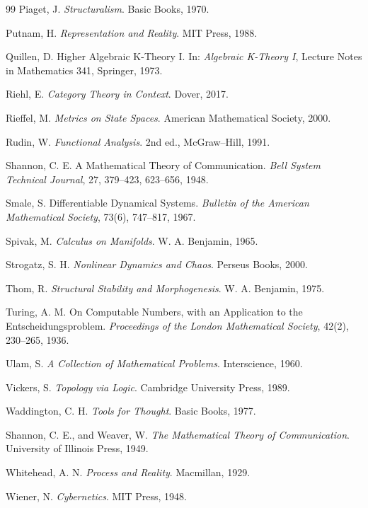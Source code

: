 \documentclass[12pt,oneside]{article}
\theoremstyle{definition}
\begin{document}
\begin{thebibliography}{99}
Piaget, J.
\textit{Structuralism}.
Basic Books, 1970.

Putnam, H.
\textit{Representation and Reality}.
MIT Press, 1988.

Quillen, D.
Higher Algebraic K-Theory I.
In:
\textit{Algebraic K-Theory I},
Lecture Notes in Mathematics 341,
Springer, 1973.

Riehl, E.
\textit{Category Theory in Context}.
Dover, 2017.

Rieffel, M.
\textit{Metrics on State Spaces}.
American Mathematical Society, 2000.

Rudin, W.
\textit{Functional Analysis}.
2nd ed., McGraw--Hill, 1991.

Shannon, C. E.
A Mathematical Theory of Communication.
\textit{Bell System Technical Journal},
27, 379--423, 623--656, 1948.

Smale, S.
Differentiable Dynamical Systems.
\textit{Bulletin of the American Mathematical Society},
73(6), 747--817, 1967.

Spivak, M.
\textit{Calculus on Manifolds}.
W. A. Benjamin, 1965.

Strogatz, S. H.
\textit{Nonlinear Dynamics and Chaos}.
Perseus Books, 2000.

Thom, R.
\textit{Structural Stability and Morphogenesis}.
W. A. Benjamin, 1975.

Turing, A. M.
On Computable Numbers, with an Application to the Entscheidungsproblem.
\textit{Proceedings of the London Mathematical Society},
42(2), 230--265, 1936.

Ulam, S.
\textit{A Collection of Mathematical Problems}.
Interscience, 1960.

Vickers, S.
\textit{Topology via Logic}.
Cambridge University Press, 1989.

Waddington, C. H.
\textit{Tools for Thought}.
Basic Books, 1977.

Shannon, C. E., and Weaver, W.
\textit{The Mathematical Theory of Communication}.
University of Illinois Press, 1949.

Whitehead, A. N.
\textit{Process and Reality}.
Macmillan, 1929.

Wiener, N.
\textit{Cybernetics}.
MIT Press, 1948.


\end{thebibliography}
\end{document}
